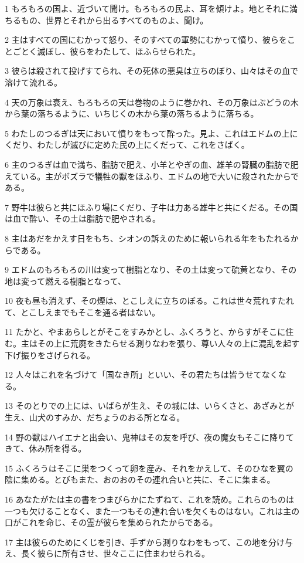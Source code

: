 \par 1 もろもろの国よ、近づいて聞け。もろもろの民よ、耳を傾けよ。地とそれに満ちるもの、世界とそれから出るすべてのものよ、聞け。
\par 2 主はすべての国にむかって怒り、そのすべての軍勢にむかって憤り、彼らをことごとく滅ぼし、彼らをわたして、ほふらせられた。
\par 3 彼らは殺されて投げすてられ、その死体の悪臭は立ちのぼり、山々はその血で溶けて流れる。
\par 4 天の万象は衰え、もろもろの天は巻物のように巻かれ、その万象はぶどうの木から葉の落ちるように、いちじくの木から葉の落ちるように落ちる。
\par 5 わたしのつるぎは天において憤りをもって酔った。見よ、これはエドムの上にくだり、わたしが滅びに定めた民の上にくだって、これをさばく。
\par 6 主のつるぎは血で満ち、脂肪で肥え、小羊とやぎの血、雄羊の腎臓の脂肪で肥えている。主がボズラで犠牲の獣をほふり、エドムの地で大いに殺されたからである。
\par 7 野牛は彼らと共にほふり場にくだり、子牛は力ある雄牛と共にくだる。その国は血で酔い、その土は脂肪で肥やされる。
\par 8 主はあだをかえす日をもち、シオンの訴えのために報いられる年をもたれるからである。
\par 9 エドムのもろもろの川は変って樹脂となり、その土は変って硫黄となり、その地は変って燃える樹脂となって、
\par 10 夜も昼も消えず、その煙は、とこしえに立ちのぼる。これは世々荒れすたれて、とこしえまでもそこを通る者はない。
\par 11 たかと、やまあらしとがそこをすみかとし、ふくろうと、からすがそこに住む。主はその上に荒廃をきたらせる測りなわを張り、尊い人々の上に混乱を起す下げ振りをさげられる。
\par 12 人々はこれを名づけて「国なき所」といい、その君たちは皆うせてなくなる。
\par 13 そのとりでの上には、いばらが生え、その城には、いらくさと、あざみとが生え、山犬のすみか、だちょうのおる所となる。
\par 14 野の獣はハイエナと出会い、鬼神はその友を呼び、夜の魔女もそこに降りてきて、休み所を得る。
\par 15 ふくろうはそこに巣をつくって卵を産み、それをかえして、そのひなを翼の陰に集める。とびもまた、おのおのその連れ合いと共に、そこに集まる。
\par 16 あなたがたは主の書をつまびらかにたずねて、これを読め。これらのものは一つも欠けることなく、また一つもその連れ合いを欠くものはない。これは主の口がこれを命じ、その霊が彼らを集められたからである。
\par 17 主は彼らのためにくじを引き、手ずから測りなわをもって、この地を分け与え、長く彼らに所有させ、世々ここに住まわせられる。


